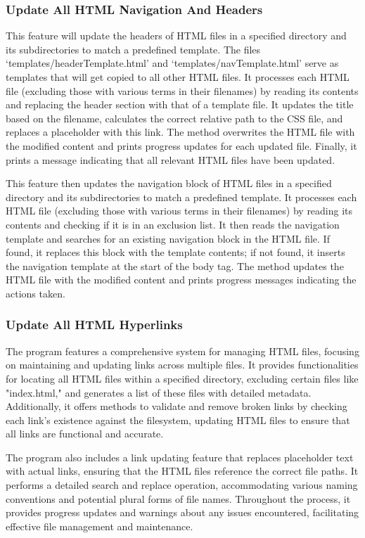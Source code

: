 \subsubsection{Update All HTML Navigation And Headers}

This feature will update the headers of HTML files in a specified directory and its subdirectories to match a predefined template. The files `templates/headerTemplate.html' and `templates/navTemplate.html' serve as templates that will get copied to all other HTML files. It processes each HTML file (excluding those with various terms in their filenames) by reading its contents and replacing the header section with that of a template file. It updates the title based on the filename, calculates the correct relative path to the CSS file, and replaces a placeholder with this link. The method overwrites the HTML file with the modified content and prints progress updates for each updated file. Finally, it prints a message indicating that all relevant HTML files have been updated. 

This feature then updates the navigation block of HTML files in a specified directory and its subdirectories to match a predefined template. It processes each HTML file (excluding those with various terms in their filenames) by reading its contents and checking if it is in an exclusion list. It then reads the navigation template and searches for an existing navigation block in the HTML file. If found, it replaces this block with the template contents; if not found, it inserts the navigation template at the start of the body tag. The method updates the HTML file with the modified content and prints progress messages indicating the actions taken.

\subsubsection{Update All HTML Hyperlinks}

The program features a comprehensive system for managing HTML files, focusing on maintaining and updating links across multiple files. It provides functionalities for locating all HTML files within a specified directory, excluding certain files like "index.html," and generates a list of these files with detailed metadata. Additionally, it offers methods to validate and remove broken links by checking each link's existence against the filesystem, updating HTML files to ensure that all links are functional and accurate.

The program also includes a link updating feature that replaces placeholder text with actual links, ensuring that the HTML files reference the correct file paths. It performs a detailed search and replace operation, accommodating various naming conventions and potential plural forms of file names. Throughout the process, it provides progress updates and warnings about any issues encountered, facilitating effective file management and maintenance.

